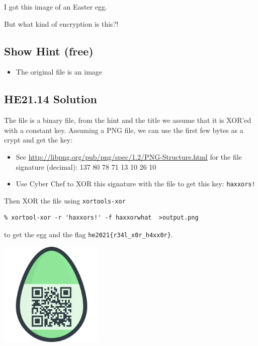 \documentclass[english,a4paper,nols,noindent]{tufte-handout}
\begin{document}
\noindent I got this image of an Easter egg.

But what kind of encryption is this?!

\subsection{Show Hint (free)}
\begin{itemize}
\item The original file is an image
\end{itemize}


\hypertarget{he21.14-solution}{%
\subsection{HE21.14 Solution}\label{he21.14-solution}}

\noindent The file is a binary file, from the hint and the title we assume that it is XOR'ed with a constant key.  Assuming a PNG file, we can use the first few bytes as a crypt and get the key:
\begin{itemize}
\item See \url{http://libpng.org/pub/png/spec/1.2/PNG-Structure.html} for the file signature (decimal): 137 80 78 71 13 10 26 10
  
\item Use Cyber Chef to XOR this signature with the file to get this key: \verb+haxxors!+
\end{itemize}

Then XOR the file using \verb+xortools-xor+

\begin{verbatim}
% xortool-xor -r 'haxxors!' -f haxxorwhat  >output.png 
\end{verbatim}

to get the egg and the flag
\verb+he2021{r34l_x0r_h4xx0r}+.
\begin{marginfigure}
    \includegraphics[width=50mm]{ch14/output.png}
\end{marginfigure}
\end{document}
